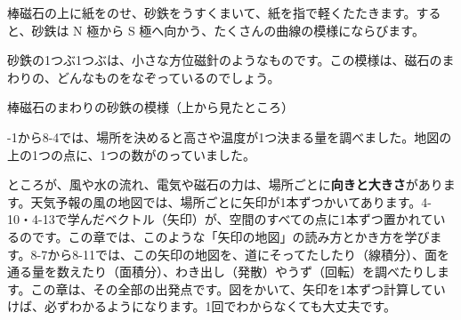 \begin{hatena}
\noindent\begin{minipage}[c]{0.44\linewidth}
\raggedright
棒磁石の上に紙をのせ、砂鉄をうすくまいて、紙を指で軽くたたきます。すると、砂鉄は N 極から S 極へ向かう、たくさんの曲線の模様にならびます。\par\vspace{4pt}
砂鉄の1つぶ1つぶは、小さな方位磁針のようなものです。この模様は、磁石のまわりの、どんなものをなぞっているのでしょう。
\end{minipage}\hfill
\begin{minipage}[c]{0.54\linewidth}
\centering
{}\par\vspace{2pt}
{\footnotesize 棒磁石のまわりの砂鉄の模様（上から見たところ）}
\end{minipage}
\end{hatena}

-1から8-4では、場所を決めると高さや温度が1つ決まる量を調べました。地図の上の1つの点に、1つの数がのっていました。

ところが、風や水の流れ、電気や磁石の力は、場所ごとに\textbf{向きと大きさ}があります。天気予報の風の地図では、場所ごとに矢印が1本ずつかいてあります。4-10・4-13で学んだベクトル（矢印）が、空間のすべての点に1本ずつ置かれているのです。この章では、このような「矢印の地図」の読み方とかき方を学びます。8-7から8-11では、この矢印の地図を、道にそってたしたり（線積分）、面を通る量を数えたり（面積分）、わき出し（発散）やうず（回転）を調べたりします。この章は、その全部の出発点です。図をかいて、矢印を1本ずつ計算していけば、必ずわかるようになります。1回でわからなくても大丈夫です。

